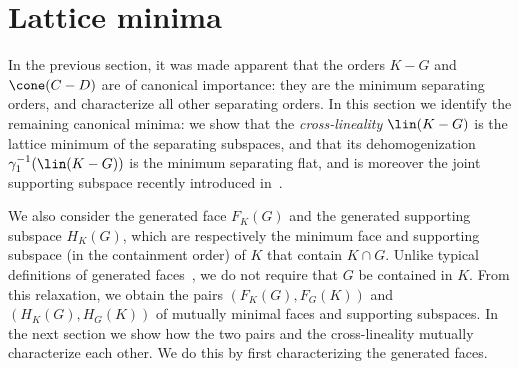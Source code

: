 \documentclass{article}
\theoremstyle{plain}
\theoremstyle{definition}
\theoremstyle{remark}
\begin{document}
\section{Lattice minima}
\label{loc:body.lattice_minima}
In the previous section, it was made apparent that the orders $K - G$ and $\cone(C-D)$ are of canonical importance: they are the minimum separating orders, and characterize all other separating orders. In this section we identify the remaining canonical minima: we show that the \emph{cross-lineality} $\lin(K-G)$ is the lattice minimum of the separating subspaces, and that its dehomogenization $\gamma_1^{-1}(\lin(K-G))$ is the minimum separating flat, and is moreover 
the joint supporting subspace recently introduced in~\cite{scottBilateralFacialReduction2026}. 

We also consider the generated face $F_K(G)$ and the generated supporting
subspace $H_K(G)$, which are respectively the 
minimum face and supporting subspace (in the containment order) of $K$
that contain $K \cap G$. Unlike typical definitions of generated faces~\cite{weisFaceGeneratedPoint2021}, we do not require that $G$
be contained in $K$. From this relaxation, we 
obtain the pairs $(F_K(G), F_G(K))$ and $(H_K(G), H_G(K))$ of mutually
minimal faces and supporting subspaces.
In the next section we show how the two pairs 
and the cross-lineality mutually characterize each other. We do this by first characterizing
the generated faces.
\end{document}
